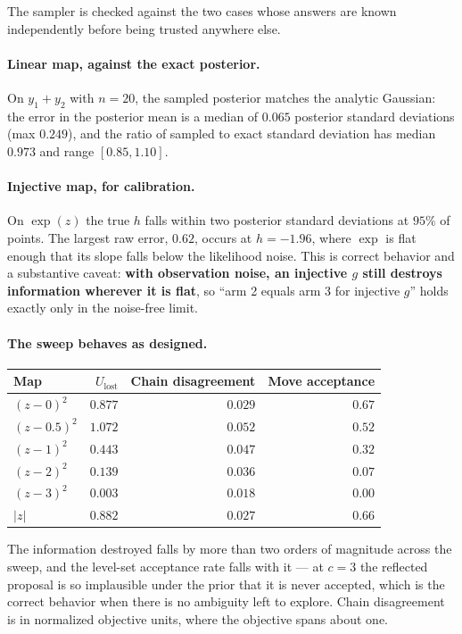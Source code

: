 \documentclass[11pt]{article}
\begin{document}
The sampler is checked against the two cases whose answers are known
independently before being trusted anywhere else.

\paragraph{Linear map, against the exact posterior.} On $y_1+y_2$ with $n=20$,
the sampled posterior matches the analytic Gaussian: the error in the posterior
mean is a median of $0.065$ posterior standard deviations (max $0.249$), and the
ratio of sampled to exact standard deviation has median $0.973$ and range
$[0.85,1.10]$.

\paragraph{Injective map, for calibration.} On $\exp(z)$ the true $h$ falls
within two posterior standard deviations at $95\%$ of points. The largest raw
error, $0.62$, occurs at $h=-1.96$, where $\exp$ is flat enough that its slope
falls below the likelihood noise. This is correct behavior and a substantive
caveat: \textbf{with observation noise, an injective $g$ still destroys
information wherever it is flat}, so ``arm 2 equals arm 3 for injective $g$''
holds exactly only in the noise-free limit.

\paragraph{The sweep behaves as designed.}

\begin{center}
\begin{tabular}{lrrr}
\toprule
Map & $U_{\text{lost}}$ & Chain disagreement & Move acceptance \\
\midrule
$(z-0)^2$   & $0.877$ & $0.029$ & $0.67$ \\
$(z-0.5)^2$ & $1.072$ & $0.052$ & $0.52$ \\
$(z-1)^2$   & $0.443$ & $0.047$ & $0.32$ \\
$(z-2)^2$   & $0.139$ & $0.036$ & $0.07$ \\
$(z-3)^2$   & $0.003$ & $0.018$ & $0.00$ \\
$|z|$       & $0.882$ & $0.027$ & $0.66$ \\
\bottomrule
\end{tabular}
\end{center}

The information destroyed falls by more than two orders of magnitude across the
sweep, and the level-set acceptance rate falls with it --- at $c=3$ the
reflected proposal is so implausible under the prior that it is never accepted,
which is the correct behavior when there is no ambiguity left to explore. Chain
disagreement is in normalized objective units, where the objective spans about
one.
\end{document}
